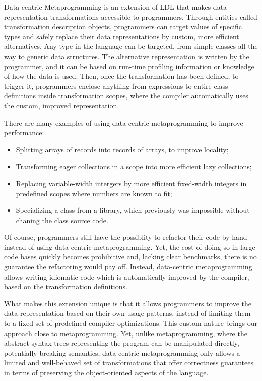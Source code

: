 Data-centric Metaprogramming is an extension of LDL that makes data representation transformations accessible to programmers. Through entities called transformation description objects, programmers can target values of specific types and safely replace their data representations by custom, more efficient alternatives. Any type in the language can be targeted, from simple classes all the way to generic data structures. The alternative representation is written by the programmer, and it can be based on run-time profiling information or knowledge of how the data is used. Then, once the transformation has been defined, to trigger it,  programmers enclose anything from expressions to entire class definitions inside transformation scopes, where the compiler automatically uses the custom, improved representation.

There are many examples of using data-centric metaprogramming to improve performance:
\begin{itemize}
  \item Splitting arrays of records into records of arrays, to improve locality;
  \item Transforming eager collections in a scope into more efficient lazy collections;
  \item Replacing variable-width intergers by more efficient fixed-width integers in predefined scopes where numbers are known to fit;
  \item Specializing a class from a library, which previously was impossible without chaning the class source code.
\end{itemize}

Of course, programmers still have the possiblity to refactor their code by hand instead of using data-centric metaprogramming. Yet, the cost of doing so in large code bases quickly becomes prohibitive and, lacking clear benchmarks, there is no guarantee the refactoring would pay off. Instead, data-centric metaprogramming allows writing idiomatic code which is automatically improved by the compiler, based on the transformation definitions.

What makes this extension unique is that it allows programmers to improve the data representation based on their own usage patterns, instead of limiting them to a fixed set of predefined compiler optimizations. This custom nature brings our approach close to metaprogramming. Yet, unlike metaprogramming, where the abstract syntax trees representing the program can be manipulated directly, potentially breaking semantics, data-centric metaprogramming only allows a limited and well-behaved set of transformations that offer correctness guarantees in terms of preserving the object-oriented aspects of the language.

